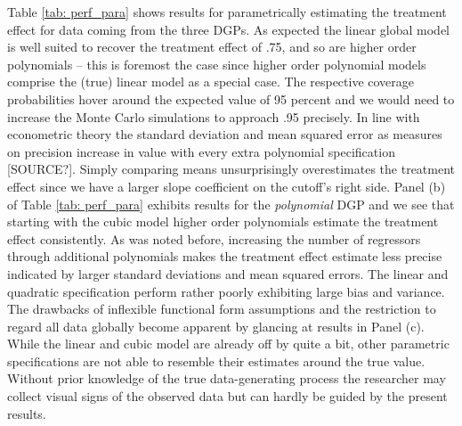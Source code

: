\documentclass[11pt, a4paper, leqno]{article}
\numberwithin{equation}{section}
\numberwithin{figure}{section}
\numberwithin{table}{section}
\numberwithin{algorithm}{section}
\begin{document}
Table \ref{tab: perf_para} shows results for parametrically estimating the treatment effect for data coming from the three DGPs. As expected the linear global model is well suited to recover the treatment effect of .75, and so are higher order polynomials -- this is foremost the case since higher order polynomial models comprise the (true) linear model as a special case. The respective coverage probabilities hover around the expected value of 95 percent and we would need to increase the Monte Carlo simulations to approach .95 precisely. In line with econometric theory the standard deviation and mean squared error as measures on precision increase in value with every extra polynomial specification [SOURCE?]. Simply comparing means unsurprisingly overestimates the treatment effect since we have a larger slope coefficient on the cutoff's right side. Panel (b) of Table \ref{tab: perf_para} exhibits results for the \textit{polynomial} DGP and we see that starting with the cubic model higher order polynomials estimate the treatment effect consistently. As was noted before, increasing the number of regressors through additional polynomials makes the treatment effect estimate less precise indicated by larger standard deviations and mean squared errors. The linear and quadratic specification perform rather poorly exhibiting large bias and variance. The drawbacks of inflexible functional form assumptions and the restriction to regard all data globally become apparent by glancing at results in Panel (c). While the linear and cubic model are already off by quite a bit, other parametric specifications are not able to resemble their estimates around the true value. Without prior knowledge of the true data-generating process the researcher may collect visual signs of the observed data but can hardly be guided by the present results.
\end{document}
